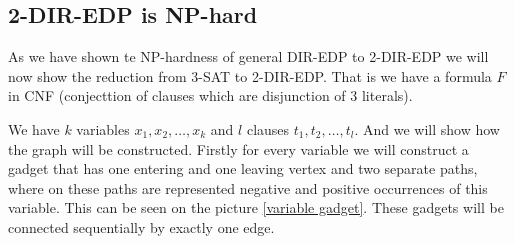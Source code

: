 \subsection{2-DIR-EDP is NP-hard}

As we have shown te NP-hardness of general DIR-EDP to 2-DIR-EDP we will now show the reduction from 3-SAT to 2-DIR-EDP. That is we have a formula $F$ in CNF (conjecttion of clauses which are disjunction of 3 literals).

We have $k$ variables $x_1, x_2, \dots, x_k$ and $l$ clauses $t_1, t_2, \dots, t_l$. And we will show how the graph will be constructed. Firstly for every variable we will construct a gadget that has one entering and one leaving vertex and two separate paths, where on these paths are represented negative and positive occurrences of this variable. This can be seen on the picture \ref{variable gadget}. These gadgets will be connected sequentially by exactly one edge.

